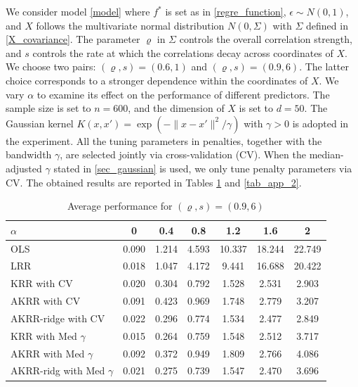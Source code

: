 \documentclass[11pt,twoside]{article}
\begin{document}
We consider model \eqref{model} where  $f^*$  is set   as in \eqref{regre_function},
 $\epsilon \sim N(0,1)$, and $X$ 
 follows the  multivariate normal distribution $N(0,\Sigma)$ with $\Sigma$ defined in  \eqref{X_covariance}.
The parameter $\varrho$ in $\Sigma$   controls the overall correlation strength, and $s$ controls the rate at which the correlations decay across coordinates of $X$. 
We choose two pairs: $(\varrho, s) = (0.6, 1)$ and $(\varrho, s) = (0.9, 6)$.
The latter choice corresponds to a stronger dependence within the coordinates of $X$.   We 
vary $\alpha$   to examine its effect on the performance of different predictors. 
The sample size is set to $n=600$, and the dimension of $X$ is set to $d=50$.   The Gaussian kernel $K(x,x') =\exp(-\|x-x'\|^2/\gamma)$ with $\gamma>0$ is adopted in the experiment. 
All the tuning parameters in penalties, together with the bandwidth $\gamma$,  are selected jointly via cross-validation (CV).
When the median-adjusted $\gamma$ stated in \cref{sec_gaussian} is used, we only 
tune penalty parameters via CV. 
The obtained 
results are reported in Tables \ref{tab_app_1} and \ref{tab_app_2}. 
\begin{table}
\centering
\caption{Average performance for 
$(\varrho, s) = (0.9, 6)$
}
\label{tab_app_1} 
\small
\setlength{\tabcolsep}{7pt}
\begin{tabular}{lcccccc}
\toprule
$\alpha$  & 0 & 0.4 & 0.8 & 1.2 & 1.6 & 2 \\
\midrule
OLS          & 0.090 & 1.214 & 4.593 & 10.337 & 18.244 & 22.749 \\
LRR          & 0.018 & 1.047 & 4.172 & 9.441  & 16.688 & 20.422 \\
\midrule
KRR with CV         & 0.020 & 0.304 & 0.792 & 1.528  & 2.531  & 2.903 \\
AKRR  with CV       & 0.091 & 0.423 & 0.969 & 1.748  & 2.779  & 3.207 \\
AKRR-ridge with CV & 0.022 & 0.296 & 0.774 & 1.534  & 2.477  & 2.849 \\
\midrule
KRR   with Med $\gamma$       & 0.015 & 0.264 & 0.759 & 1.548 & 2.512 & 3.717 \\
AKRR  with Med $\gamma$       & 0.092 & 0.372 & 0.949 & 1.809 & 2.766 & 4.086 \\
AKRR-ridg with Med $\gamma$  & 0.021 & 0.275 & 0.739 & 1.547 & 2.470 & 3.696 \\
\bottomrule
\end{tabular}
\end{table}
\end{document}
